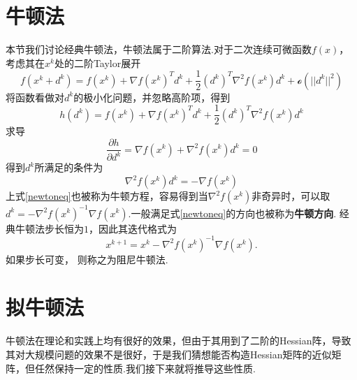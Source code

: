 \section{牛顿法}
本节我们讨论经典牛顿法，牛顿法属于二阶算法.对于二次连续可微函数$f(x)$，考虑其在$x^k$处的二阶Taylor展开
\begin{equation*}
	f(x^k + d^k) = f(x^k) + \nabla f(x^k)^Td^k+\frac{1}{2}(d^k)^T\nabla^2 f(x^k)d^k + \mathcal{o}(||d^k||^2)
\end{equation*}
将函数看做对$d^k$的极小化问题，并忽略高阶项，得到
\begin{equation*}
	h(d^k) = f(x^k) + \nabla f(x^k)^Td^k+\frac{1}{2}(d^k)^T\nabla^2 f(x^k)d^k
\end{equation*}
求导
\begin{equation*}
	\frac{\partial h}{\partial d^k} = \nabla f(x^k) + \nabla^2f(x^k)d^k = 0
\end{equation*}
得到$d^k$所满足的条件为
\begin{equation}\label{newtoneq}
	\nabla^2f(x^k)d^k = -\nabla f(x^k)
\end{equation}
上式\eqref{newtoneq}也被称为牛顿方程，容易得到当$\nabla^2f(x^k)$非奇异时，可以取$d^k = -\nabla^2f(x^k)^{-1}\nabla f(x^k)$.一般满足式\eqref{newtoneq}的方向也被称为\textbf{牛顿方向}.
经典牛顿法步长恒为$1$，因此其迭代格式为
\begin{equation*}
	x^{k+1} = x^k -\nabla^2f(x^k)^{-1}\nabla f(x^k).
\end{equation*}
如果步长可变， 则称之为阻尼牛顿法.
\section{拟牛顿法}
牛顿法在理论和实践上均有很好的效果，但由于其用到了二阶的Hessian阵，导致其对大规模问题的效果不是很好，于是我们猜想能否构造Hessian矩阵的近似矩阵，但任然保持一定的性质.我们接下来就将推导这些性质.
